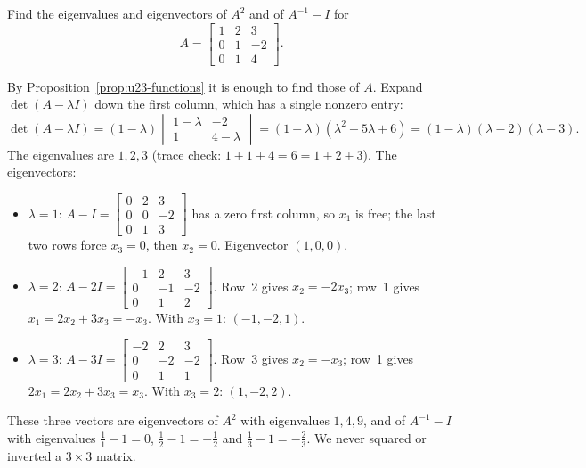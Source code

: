 \begin{example}\label{ex:u23-recitation}
Find the eigenvalues and eigenvectors of $A^{2}$ and of $A^{-1}-I$ for
\[
  A=\begin{bmatrix} 1&2&3\\ 0&1&-2\\ 0&1&4\end{bmatrix}.
\]

By Proposition~\ref{prop:u23-functions} it is enough to find those of $A$. Expand
$\det(A-\lambda I)$ down the first column, which has a single nonzero entry:
\[
  \det(A-\lambda I)=(1-\lambda)\begin{vmatrix} 1-\lambda & -2\\ 1 & 4-\lambda\end{vmatrix}
  =(1-\lambda)(\lambda^{2}-5\lambda+6)=(1-\lambda)(\lambda-2)(\lambda-3).
\]
The eigenvalues are $1,2,3$ (trace check: $1+1+4=6=1+2+3$). The eigenvectors:
\begin{itemize}
  \item $\lambda=1$: $A-I=\left[\begin{smallmatrix} 0&2&3\\ 0&0&-2\\ 0&1&3\end{smallmatrix}\right]$
  has a zero first column, so $x_1$ is free; the last two rows force $x_3=0$, then $x_2=0$.
  Eigenvector $(1,0,0)$.
  \item $\lambda=2$: $A-2I=\left[\begin{smallmatrix} -1&2&3\\ 0&-1&-2\\ 0&1&2\end{smallmatrix}\right]$.
  Row~2 gives $x_2=-2x_3$; row~1 gives $x_1=2x_2+3x_3=-x_3$. With $x_3=1$: $(-1,-2,1)$.
  \item $\lambda=3$: $A-3I=\left[\begin{smallmatrix} -2&2&3\\ 0&-2&-2\\ 0&1&1\end{smallmatrix}\right]$.
  Row~3 gives $x_2=-x_3$; row~1 gives $2x_1=2x_2+3x_3=x_3$. With $x_3=2$: $(1,-2,2)$.
\end{itemize}
These three vectors are eigenvectors of $A^{2}$ with eigenvalues $1,4,9$, and of $A^{-1}-I$
with eigenvalues $\tfrac11-1=0$, $\tfrac12-1=-\tfrac12$ and $\tfrac13-1=-\tfrac23$. We
never squared or inverted a $3\times3$ matrix.
\end{example}

